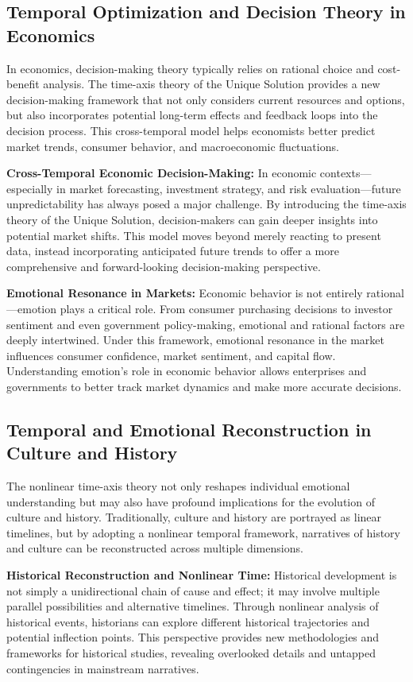 \documentclass[12pt]{article}
\begin{document}
\subsection{Temporal Optimization and Decision Theory in Economics}

In economics, decision-making theory typically relies on rational choice and cost-benefit analysis. The time-axis theory of the Unique Solution provides a new decision-making framework that not only considers current resources and options, but also incorporates potential long-term effects and feedback loops into the decision process. This cross-temporal model helps economists better predict market trends, consumer behavior, and macroeconomic fluctuations.

\textbf{Cross-Temporal Economic Decision-Making:} In economic contexts—especially in market forecasting, investment strategy, and risk evaluation—future unpredictability has always posed a major challenge. By introducing the time-axis theory of the Unique Solution, decision-makers can gain deeper insights into potential market shifts. This model moves beyond merely reacting to present data, instead incorporating anticipated future trends to offer a more comprehensive and forward-looking decision-making perspective.

\textbf{Emotional Resonance in Markets:} Economic behavior is not entirely rational—emotion plays a critical role. From consumer purchasing decisions to investor sentiment and even government policy-making, emotional and rational factors are deeply intertwined. Under this framework, emotional resonance in the market influences consumer confidence, market sentiment, and capital flow. Understanding emotion's role in economic behavior allows enterprises and governments to better track market dynamics and make more accurate decisions.

\subsection{Temporal and Emotional Reconstruction in Culture and History}

The nonlinear time-axis theory not only reshapes individual emotional understanding but may also have profound implications for the evolution of culture and history. Traditionally, culture and history are portrayed as linear timelines, but by adopting a nonlinear temporal framework, narratives of history and culture can be reconstructed across multiple dimensions.

\textbf{Historical Reconstruction and Nonlinear Time:} Historical development is not simply a unidirectional chain of cause and effect; it may involve multiple parallel possibilities and alternative timelines. Through nonlinear analysis of historical events, historians can explore different historical trajectories and potential inflection points. This perspective provides new methodologies and frameworks for historical studies, revealing overlooked details and untapped contingencies in mainstream narratives.
\end{document}
